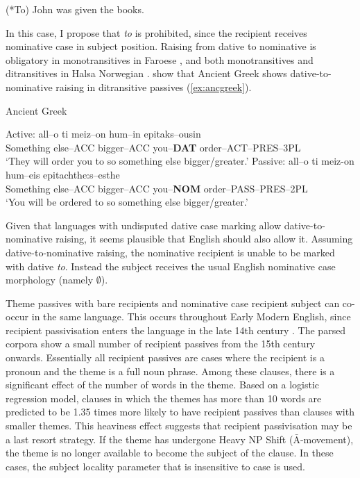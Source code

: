 {\begin{exe}
\ex (*To) John was given the books.
\end{exe}

In this case, I propose that \textit{to} is prohibited, since the recipient receives nominative case in subject position. Raising from dative to nominative is obligatory in monotransitives in Faroese \citep{Barnes.1986,Hoskuldurrainsson.2004}, and both monotransitives and ditransitives in Halsa Norwegian \citep{Eyorsson.2012}. \cite{Alexiadou.2013,Alexiadou.2013b} show that Ancient Greek shows dative-to-nominative raising in ditransitive passives (\ref{ex:ancgreek}).
\begin{exe}
\ex\label{ex:ancgreek} Ancient Greek \citep[ex. 2]{Alexiadou.2013b}
\begin{xlist}
\ex Active: \gll all--o ti meiz--on hum--in epitaks--ousin\\
{Something else}--ACC bigger--ACC you--\textbf{DAT} order--ACT--PRES--3PL\\
\trans `They will order you to so something else bigger/greater.'
\ex Passive: \gll all--o ti meiz-on hum--eis epitachthe:s--esthe\\
{Something else}--ACC bigger--ACC you--\textbf{NOM} order--PASS--PRES--2PL\\
\trans `You will be ordered to so something else bigger/greater.' 
\end{xlist}
\end{exe}%
Given that languages with undisputed dative case marking allow dative-to-nominative raising, it seems plausible that English should also allow it. Assuming dative-to-nominative raising, the nominative recipient is unable to be marked with dative \textit{to}. Instead the subject receives the usual English nominative case morphology (namely $\emptyset$).



Theme passives with bare recipients and nominative case recipient subject can co-occur in the same language. This occurs throughout Early Modern English, since recipient passivisation enters the language in the late 14th century \citep{Allen.1999}. The parsed corpora show a small number of recipient passives from the 15th century onwards. Essentially all recipient passives are cases where the recipient is a pronoun and the theme is a full noun phrase. Among these clauses, there is a significant effect of the number of words in the theme. Based on a logistic regression model, clauses in which the themes has more than 10 words are predicted to be 1.35 times more likely to have recipient passives than clauses with smaller themes. This heaviness effect suggests that recipient passivisation may be a last resort strategy. If the theme has undergone Heavy NP Shift ($\bar{\text{A}}$-movement), the theme is no longer available to become the subject of the clause. In these cases, the subject locality parameter that is insensitive to case is used.

}
